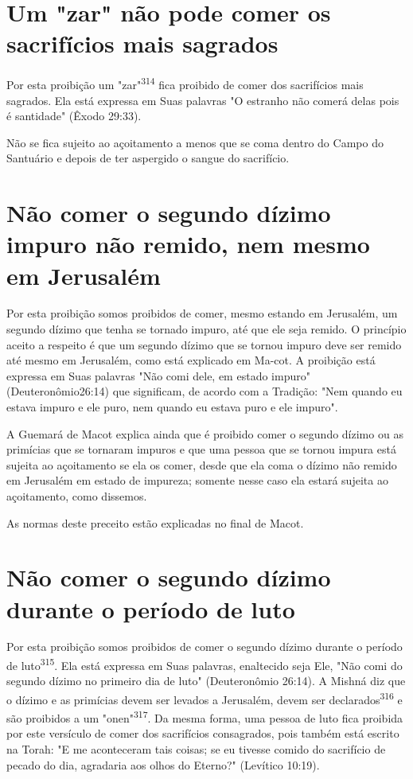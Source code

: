 \begin{itemize}
\begin{enumrate}
\begin{itemize}
\begin{itemize}
\begin{itemize}
\section{Um "zar" não pode comer os sacrifícios mais sagrados}

Por esta proibição um "zar"\textsuperscript{314} fica proibido de comer
dos sacrifí­cios mais sagrados. Ela está expressa em Suas palavras "O
estranho não comerá delas pois é santidade" (Êxodo 29:33).

Não se fica sujeito ao açoitamento a menos que se coma dentro do Campo
do Santuário e depois de ter aspergido o sangue do sacrifício.

\section{Não comer o segundo dízimo impuro não remido, nem mesmo em Jerusalém}

Por esta proibição somos proibidos de comer, mesmo estando em Jerusalém,
um segundo dízimo que tenha se tornado impuro, até que ele seja remido.
O princípio aceito a respeito é que um segundo dízimo que se tornou
impuro deve ser remido até mesmo em Jerusalém, como está explicado em
Ma-cot. A proibição está expressa em Suas palavras "Não comi dele, em
estado im­puro" (Deuteronômio26:14) que significam, de acordo com a
Tradição: "Nem quando eu estava impuro e ele puro, nem quando eu estava
puro e ele impuro".

A Guemará de Macot explica ainda que é proibido comer o segundo dízimo
ou as primícias que se tornaram impuros e que uma pessoa que se tor­nou
impura está sujeita ao açoitamento se ela os comer, desde que ela coma o
dízimo não remido em Jerusalém em estado de impureza; somente nesse
ca­so ela estará sujeita ao açoitamento, como dissemos.

As normas deste preceito estão explicadas no final de Macot.

\section{Não comer o segundo dízimo durante o período de luto}

Por esta proibição somos proibidos de comer o segundo dízimo du­rante o
período de luto\textsuperscript{315}. Ela está expressa em Suas
palavras, enaltecido seja Ele, "Não comi do segundo dízimo no primeiro
dia de luto" (Deuteronômio 26:14). A Mishná diz que o dízimo e as
primícias devem ser levados a Jerusa­lém, devem ser
declarados\textsuperscript{316} e são proibidos a um
"onen"\textsuperscript{317}. Da mesma for­ma, uma pessoa de luto fica
proibida por este versículo de comer dos sacrifí­cios consagrados, pois
também está escrito na Torah: "E me aconteceram tais coisas; se eu
tivesse comido do sacrifício de pecado do dia, agradaria aos olhos do
Eterno?" (Levítico 10:19).


\end{itemize}
\end{itemize}
\end{itemize}
\end{enumrate}
\end{itemize}
